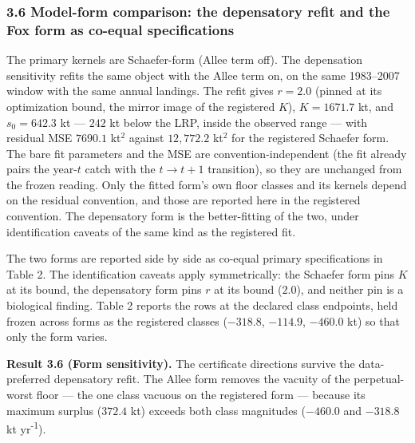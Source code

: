 \documentclass[11pt]{article}
\begin{document}
\subsubsection{3.6 Model-form comparison: the depensatory refit and the
Fox form as co-equal
specifications}\label{model-form-comparison-the-depensatory-refit-and-the-fox-form-as-co-equal-specifications}

The primary kernels are Schaefer-form (Allee term off). The depensation
sensitivity refits the same object with the Allee term on, on the same
1983--2007 window with the same annual landings. The refit gives
\(r = 2.0\) (pinned at its optimization bound, the mirror image of the
registered \(K\)), \(K = 1671.7\) kt, and \(s_0 = 642.3\) kt --- \(242\)
kt below the LRP, inside the observed range --- with residual MSE
\(7690.1\) kt\(^2\) against \(12{,}772.2\) kt\(^2\) for the registered
Schaefer form. The bare fit parameters and the MSE are
convention-independent (the fit already pairs the year-\(t\) catch with
the \(t \to t+1\) transition), so they are unchanged from the frozen
reading. Only the fitted form's own floor classes and its kernels depend
on the residual convention, and those are reported here in the
registered convention. The depensatory form is the better-fitting of
the two, under identification caveats of the same kind as the registered
fit.

The two forms are reported side by side as co-equal primary
specifications in Table 2. The identification caveats apply
symmetrically: the Schaefer form pins \(K\) at its bound, the
depensatory form pins \(r\) at its bound (\(2.0\)), and neither pin is a
biological finding. Table 2 reports the rows at the declared class
endpoints, held frozen across forms as the registered classes
(\(-318.8\), \(-114.9\), \(-460.0\) kt) so that only the form varies.

\textbf{Result 3.6 (Form sensitivity).} The certificate directions
survive the data-preferred depensatory refit. The Allee form removes the
vacuity of the perpetual-worst floor --- the one class vacuous on the
registered form --- because its maximum surplus (\(372.4\) kt) exceeds
both class magnitudes (\(-460.0\) and \(-318.8\) kt yr\textsuperscript{-1}).
\end{document}
